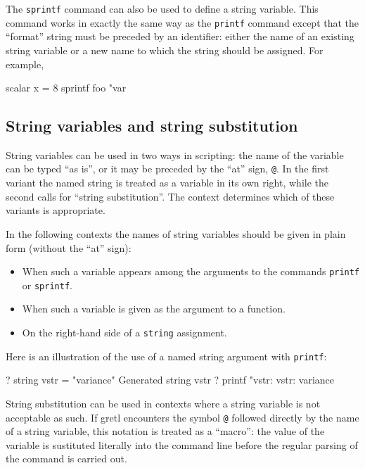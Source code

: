 The \texttt{sprintf} command can also be used to define a string
variable. This command works in exactly the same way as the
\texttt{printf} command except that the ``format'' string must be
preceded by an identifier: either the name of an existing string
variable or a new name to which the string should be assigned.
For example,
%
\begin{code}
scalar x = 8
sprintf foo "var%
\end{code}

\subsection{String variables and string substitution}

String variables can be used in two ways in scripting: the name of the
variable can be typed ``as is'', or it may be preceded by the ``at''
sign, \verb|@|. In the first variant the named string is treated as a
variable in its own right, while the second calls for ``string
substitution''. The context determines which of these variants is
appropriate. 

In the following contexts the names of string variables should be
given in plain form (without the ``at'' sign):

\begin{itemize}
\item When such a variable appears among the arguments to the
  commands \texttt{printf} or \texttt{sprintf}.
\item When such a variable is given as the argument to a function.
\item On the right-hand side of a \texttt{string} assignment.
\end{itemize}

Here is an illustration of the use of a named string argument with
\texttt{printf}:
%
\begin{code}
? string vstr = "variance"
Generated string vstr
? printf "vstr: %
vstr:     variance
\end{code}

String substitution can be used in contexts where a string variable is
not acceptable as such. If gretl encounters the symbol \verb|@|
followed directly by the name of a string variable, this notation is
treated as a ``macro'': the value of the variable is sustituted
literally into the command line before the regular parsing of the
command is carried out.


